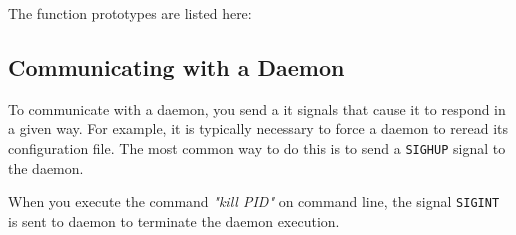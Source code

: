 The function prototypes are listed here:
%

%

\subsection{Communicating with a Daemon}
%
To communicate with a daemon, you send a it signals that cause it to respond in a given way.
For example, it is typically necessary to force a daemon to reread its configuration file.
The most common way to do this is to send a \texttt{SIGHUP} signal to the daemon.

When you execute the command \textit{"kill PID"} on command line, the signal \texttt{SIGINT} is sent to daemon to terminate the daemon execution.

